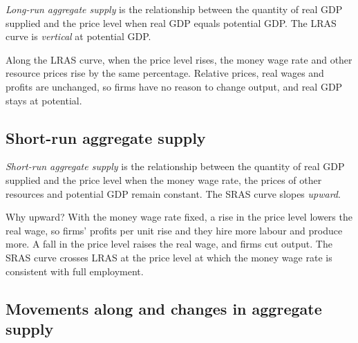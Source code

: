 \begin{definition}[LRAS]
\emph{Long-run aggregate supply} is the relationship between the quantity of real GDP
supplied and the price level when real GDP equals potential GDP. The LRAS curve is
\emph{vertical} at potential GDP.
\end{definition}

Along the LRAS curve, when the price level rises, the money wage rate and other resource
prices rise by the same percentage. Relative prices, real wages and profits are unchanged,
so firms have no reason to change output, and real GDP stays at potential.

\subsection{Short-run aggregate supply}

\begin{definition}[SRAS]
\emph{Short-run aggregate supply} is the relationship between the quantity of real GDP
supplied and the price level when the money wage rate, the prices of other resources and
potential GDP remain constant. The SRAS curve slopes \emph{upward}.
\end{definition}

Why upward? With the money wage rate fixed, a rise in the price level lowers the real
wage, so firms' profits per unit rise and they hire more labour and produce more. A fall in
the price level raises the real wage, and firms cut output. The SRAS curve crosses LRAS at
the price level at which the money wage rate is consistent with full employment.

\subsection{Movements along and changes in aggregate supply}

